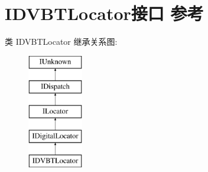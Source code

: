\hypertarget{interface_i_d_v_b_t_locator}{}\section{I\+D\+V\+B\+T\+Locator接口 参考}
\label{interface_i_d_v_b_t_locator}
类 I\+D\+V\+B\+T\+Locator 继承关系图\+:\begin{figure}[H]
\begin{center}
\leavevmode
\includegraphics[height=5.000000cm]{interface_i_d_v_b_t_locator}
\end{center}
\end{figure}
